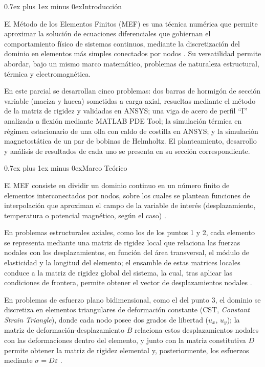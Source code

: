 \documentclass[conference]{IEEEtran}
\makeatletter
\def\section{\@startsection{section}{1}{\z@}{1.5ex plus 1.5ex minus 0.5ex}%
{0.7ex plus 1ex minus 0ex}{\normalfont\large\bfseries\centering\scshape}}%
\makeatother
\begin{document}
\section{Introducción}

El Método de los Elementos Finitos (MEF) es una técnica numérica que permite aproximar la solución de ecuaciones diferenciales que gobiernan el comportamiento físico de sistemas continuos, mediante la discretización del dominio en elementos más simples conectados por nodos \cite{zienkiewicz2013}\cite{bathe1996}. Su versatilidad permite abordar, bajo un mismo marco matemático, problemas de naturaleza estructural, térmica y electromagnética.

En este parcial se desarrollan cinco problemas: dos barras de hormigón de sección variable (maciza y hueca) sometidas a carga axial, resueltas mediante el método de la matriz de rigidez y validadas en ANSYS; una viga de acero de perfil ``I'' analizada a flexión mediante MATLAB PDE Tool; la simulación térmica en régimen estacionario de una olla con caldo de costilla en ANSYS; y la simulación magnetostática de un par de bobinas de Helmholtz. El planteamiento, desarrollo y análisis de resultados de cada uno se presenta en su sección correspondiente.

\section{Marco Teórico}

El MEF consiste en dividir un dominio continuo en un número finito de elementos interconectados por nodos, sobre los cuales se plantean funciones de interpolación que aproximan el campo de la variable de interés (desplazamiento, temperatura o potencial magnético, según el caso) \cite{logan2012}\cite{reddy2005}.

En problemas estructurales axiales, como los de los puntos 1 y 2, cada elemento se representa mediante una matriz de rigidez local que relaciona las fuerzas nodales con los desplazamientos, en función del área transversal, el módulo de elasticidad y la longitud del elemento; el ensamble de estas matrices locales conduce a la matriz de rigidez global del sistema, la cual, tras aplicar las condiciones de frontera, permite obtener el vector de desplazamientos nodales \cite{logan2012}.

En problemas de esfuerzo plano bidimensional, como el del punto 3, el dominio se discretiza en elementos triangulares de deformación constante (CST, \textit{Constant Strain Triangle\/}), donde cada nodo posee dos grados de libertad ($u_x$, $u_y$); la matriz de deformación-desplazamiento $B$ relaciona estos desplazamientos nodales con las deformaciones dentro del elemento, y junto con la matriz constitutiva $D$ permite obtener la matriz de rigidez elemental y, posteriormente, los esfuerzos mediante $\sigma=D\varepsilon$ \cite{reddy2005}.
\end{document}

